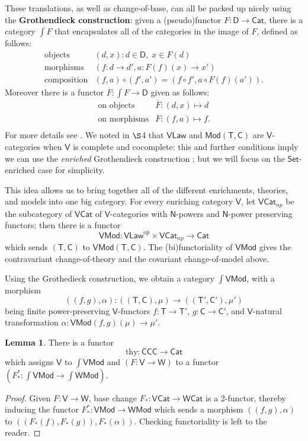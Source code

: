 \documentclass{amsart}
\theoremstyle{definition}
\newtheorem{lemma}[theorem]{Lemma}
\newcommand{\Set}{\mathsf{Set}}
\newcommand{\Cat}{\mathsf{Cat}}
\newcommand{\Law}{\mathsf{Law}}
\newcommand{\CCC}{\mathsf{CCC}}
\newcommand{\Mod}{\mathsf{Mod}}
\newcommand{\NN}{\mathsf{N}}
\newcommand{\V}{\mathsf{V}}
\newcommand{\W}{\mathsf{W}}
\newcommand{\D}{\mathsf{D}}
\newcommand{\C}{\mathsf{C}}
\newcommand{\T}{\mathsf{T}}
\newcommand{\op}{\mathrm{op}}
\newcommand{\maps}{\colon}
\begin{document}
These translations, as well as change-of-base, can all be packed up nicely using the \textbf{Grothendieck construction}: given a (pseudo)functor $F\maps \D \to \Cat$, there is a category $\int F$ that encapsulates all of the categories in the image of $F$, defined
as follows:
\[\begin{array}{rl}
\text{objects} & (d,x) \colon d\in \D, \; x\in F(d)\\
\text{morphisms} & (f\maps d\to d',a\maps F(f)(x)\to x')\\
\text{composition} & (f,a) \circ (f',a') = (f \circ f', a \circ F(f)(a')).
\end{array}\]
Moreover there is a functor $\overline{F} \maps \int F \to \D$ given as follows:
\[\begin{array}{rl}
\text{on objects} & \overline{F} \maps (d,x) \mapsto d \\
\text{on morphisms} & \overline{F} \maps (f,a) \mapsto f .\\
\end{array}\]
For more details see \cite{borceux,jacobs}.  We noted in $\S$4 that $\V\Law$ and $\Mod(\T,\C)$ are $\V$-categories when $\V$ is complete and cocomplete: this and further conditions imply we can use the \textit{enriched} Grothendieck construction \cite{beardsleywong}; but we will focus on the $\Set$-enriched case for simplicity. 

This idea allows us to bring together all of the different enrichments, theories, and models into one big category. For every enriching category $\V$, let $\V\Cat_{np}$ be the subcategory of $\V\Cat$ of $\V$-categories with $\NN$-powers and $\NN$-power preserving functors; then there is a functor $$\V\Mod\maps \V\Law^\op \times \V\Cat_{np} \to \Cat$$ which sends $(\T,\C)$ to $\V\Mod(\T,\C)$. The (bi)functoriality of $\V\Mod$ gives the contravariant change-of-theory and the covariant change-of-model above.

Using the Grothedieck construction, we obtain a category \textbf{$\int \V\Mod$}, with a morphism $$((f,g),\alpha)\maps ((\T,\C),\mu) \to ((\T',\C'),\mu')$$ being finite power-preserving $\V$-functors $f\maps\T\to \T'$, $g\maps\C\to \C'$, and $\V$-natural transformation $\alpha\maps\V\Mod(f,g)(\mu)\to \mu'$.

\begin{lemma}
	There is a functor $$\mathrm{thy}\maps \CCC \to \Cat$$ which assigns $\V$ to $\int \V\Mod$ and $(F\maps \V \to \W)$ to a functor $(F_*^*\maps \int \V\Mod \to \int \W\Mod)$.
\end{lemma}
\begin{proof}
	Given $F\maps\V\to \W$, base change $F_*\maps \V\Cat \to \W\Cat$ is a 2-functor, thereby inducing the functor $F_*^*\maps\V\Mod\to \W\Mod$ which sends a morphism $((f,g),\alpha)$ to $((F_*(f),F_*(g)),F_*(\alpha))$. Checking functoriality is left to the reader.
\end{proof}
\end{document}
